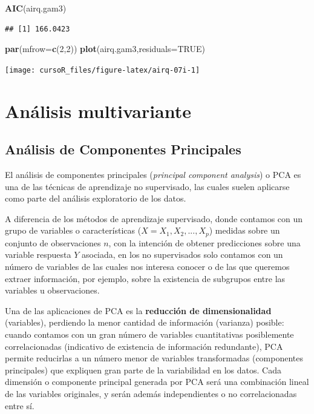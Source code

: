 \documentclass[]{book}
\newenvironment{Shaded}{\begin{snugshade}}{\end{snugshade}}
\newcommand{\KeywordTok}[1]{\textcolor[rgb]{0.13,0.29,0.53}{\textbf{#1}}}
\newcommand{\DataTypeTok}[1]{\textcolor[rgb]{0.13,0.29,0.53}{#1}}
\newcommand{\DecValTok}[1]{\textcolor[rgb]{0.00,0.00,0.81}{#1}}
\newcommand{\OtherTok}[1]{\textcolor[rgb]{0.56,0.35,0.01}{#1}}
\newcommand{\NormalTok}[1]{#1}
\begin{document}
\begin{Shaded}
\begin{Highlighting}[]
\KeywordTok{AIC}\NormalTok{(airq.gam3)}
\end{Highlighting}
\end{Shaded}

\begin{verbatim}
## [1] 166.0423
\end{verbatim}

\begin{Shaded}
\begin{Highlighting}[]
\KeywordTok{par}\NormalTok{(}\DataTypeTok{mfrow=}\KeywordTok{c}\NormalTok{(}\DecValTok{2}\NormalTok{,}\DecValTok{2}\NormalTok{))}
\KeywordTok{plot}\NormalTok{(airq.gam3,}\DataTypeTok{residuals=}\OtherTok{TRUE}\NormalTok{)}
\end{Highlighting}
\end{Shaded}

\begin{center}\texttt{[image: cursoR\_files/figure-latex/airq-07i-1]} \end{center}

\chapter{Análisis multivariante}\label{anuxe1lisis-multivariante}

\section{Análisis de Componentes
Principales}\label{anuxe1lisis-de-componentes-principales}

El análisis de componentes principales (\emph{principal component
analysis}) o PCA es una de las técnicas de aprendizaje no supervisado,
las cuales suelen aplicarse como parte del análisis exploratorio de los
datos.

A diferencia de los métodos de aprendizaje supervisado, donde contamos
con un grupo de variables o características (\(X=X_1,X_2,...,X_p\))
medidas sobre un conjunto de observaciones \(n\), con la intención de
obtener predicciones sobre una variable respuesta \(Y\) asociada, en los
no supervisados solo contamos con un número de variables de las cuales
nos interesa conocer o de las que queremos extraer información, por
ejemplo, sobre la existencia de subgrupos entre las variables u
observaciones.

Una de las aplicaciones de PCA es la \textbf{reducción de
dimensionalidad} (variables), perdiendo la menor cantidad de información
(varianza) posible: cuando contamos con un gran número de variables
cuantitativas posiblemente correlacionadas (indicativo de existencia de
información redundante), PCA permite reducirlas a un número menor de
variables transformadas (componentes principales) que expliquen gran
parte de la variabilidad en los datos. Cada dimensión o componente
principal generada por PCA será una combinación lineal de las variables
originales, y serán además independientes o no correlacionadas entre sí.
\end{document}
